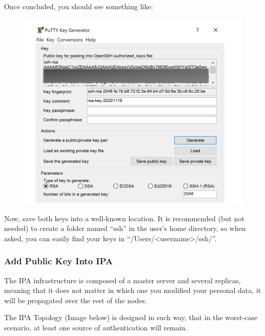 Once concluded, you should see something like:

\begin{figure}
  \includegraphics[width=13cm]{Images/example10.png}
  \centering
\end{figure}

\vspace{5 mm}
Now, save both keys into a well-known location. It is recommended (but not needed) to create a folder
named “ssh” in the user’s home directory, so when asked, you can easily find your keys in
“/Users/<username>/ssh/”.

\newpage

\subsubsection{Add Public Key Into IPA}

The IPA infrastructure is composed of a master server and several replicas, meaning that it does
not matter in which one you modified your personal data, it will be propagated over the rest of the nodes.

\vspace{5 mm}

The IPA Topology (Image below) is designed in such way, that in the worst-case scenario, at least one source
of authentication will remain.

